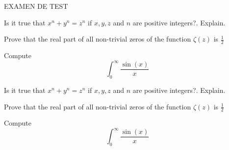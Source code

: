 \documentclass[addpoints]{exam}
\begin{document}
\begin{center}
    \Large EXAMEN DE TEST
\end{center}

\begin{center}
\end{center}

\vspace{5mm}

\vspace{5mm}

\begin{questions}
\question Is it true that \(x^n + y^n = z^n\) if \(x,y,z\) and \(n\) are
positive integers?. Explain.

\question Prove that the real part of all non-trivial zeros of the function
\(\zeta(z)\) is \(\frac{1}{2}\)

\question Compute \[\int_{0}^{\infty} \frac{\sin(x)}{x}\]
\end{questions}

\begin{questions}

\question Is it true that \(x^n + y^n = z^n\) if \(x,y,z\) and \(n\) are positive integers?. Explain.

\question Prove that the real part of all non-trivial zeros of the function \(\zeta(z)\) is \(\frac{1}{2}\)

\question Compute \[\int_{0}^{\infty} \frac{\sin(x)}{x}\]

\end{questions}
\clearpage
\end{document}
